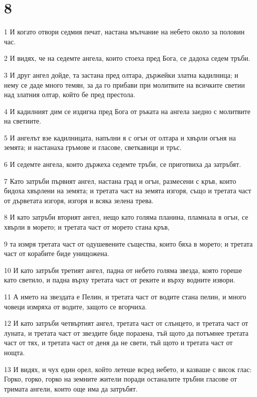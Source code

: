 \chapter{8}

\par 1 И когато отвори седмия печат, настана мълчание на небето около за половин час.
\par 2 И видях, че на седемте ангела, които стоеха пред Бога, се дадоха седем тръби.
\par 3 И друг ангел дойде, та застана пред олтара, държейки златна кадилница; и нему се даде много темян, за да го прибави при молитвите на всичките светии над златния олтар, който бе пред престола.
\par 4 И кадилният дим се издигна пред Бога от ръката на ангела заедно с молитвите на светиите.
\par 5 И ангелът взе кадилницата, напълни я с огън от олтара и хвърли огъня на земята; и настанаха гръмове и гласове, светкавици и тръс.
\par 6 И седемте ангела, които държеха седемте тръби, се приготвиха да затръбят.
\par 7 Като затръби първият ангел, настана град и огън, размесени с кръв, които бидоха хвърлени на земята; и третата част на земята изгоря, също и третата част от дърветата изгоря, изгоря и всяка зелена трева.
\par 8 И като затръби вторият ангел, нещо като голяма планина, пламнала в огън, се хвърли в морето; и третата част от морето стана кръв,
\par 9 та измря третата част от одушевените същества, които бяха в морето; и третата част от корабите биде унищожена.
\par 10 И като затръби третият ангел, падна от небето голяма звезда, която гореше като светило, и падна върху третата част от реките и върху водните извори.
\par 11 А името на звездата е Пелин, и третата част от водите стана пелин, и много човеци измряха от водите, защото се вгорчиха.
\par 12 И като затръби четвъртият ангел, третата част от слънцето, и третата част от луната, и третата част от звездите биде поразена, тъй щото да потъмнее третата част от тях, и третата част от деня да не свети, тъй щото и третата част от нощта.
\par 13 И видях, и чух един орел, който летеше всред небето, и казваше с висок глас: Горко, горко, горко на земните жители поради останалите тръбни гласове от тримата ангели, които още има да затръбят.

